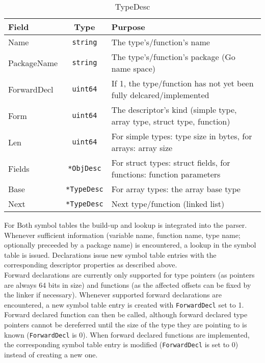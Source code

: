 \documentclass[a4paper]{scrreprt}
\begin{document}
      \begin{table}[htb]
      \centering
      \begin{tabular}{lc p{}}
        \toprule
        \textbf{Field} & \textbf{Type} & \textbf{Purpose}\\
        \midrule
        Name & \texttt{string} & The type's/function's name\\
        PackageName & \texttt{string} & The type's/function's package (Go name space)\\
        ForwardDecl & \texttt{uint64} & If 1, the type/function has not yet been fully delcared/implemented\\
        Form & \texttt{uint64} & The descriptor's kind (simple type, array type, struct type, function)\\
        Len & \texttt{uint64} & For simple types: type size in bytes, for arrays: array size\\
        Fields & \texttt{*ObjDesc} & For struct types: struct fields, for functions: function parameters\\
        Base & \texttt{*TypeDesc} & For array types: the array base type\\
        Next & \texttt{*TypeDesc} & Next type/function (linked list)\\
        \bottomrule
      \end{tabular}
      \caption{TypeDesc}
      \label{tbl:typedesc}
      \end{table}

    For Both symbol tables the build-up and lookup is integrated into the parser. Whenever sufficient information (variable name, function name, type name; optionally preceeded by a package name) is encountered, a lookup in the symbol table is issued. Declarations issue new symbol table entries with the corresponding descriptor properties as described above.\\
    Forward declarations are currently only supported for type pointers (as pointers are always 64 bits in size) and functions (as the affected offsets can be fixed by the linker if necessary). Whenever supported forward declarations are encountered, a new symbol table entry is created with \texttt{ForwardDecl} set to 1. Forward declared function can then be called, although forward declared type pointers cannot be dereferred until the size of the type they are pointing to is known (\texttt{ForwardDecl} is 0). When forward declared functions are implemented, the corresponding symbol table entry is modified (\texttt{ForwardDecl} is set to 0) instead of creating a new one.
      
\end{document}
